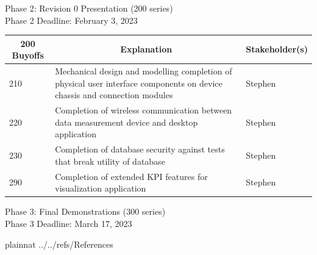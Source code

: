 \documentclass[12pt]{article}
\begin{document}
\newpage
\noindent
Phase 2: Revision 0 Presentation (200 series)\\
Phase 2 Deadline: February 3, 2023\\

\begin{table}[H]
  \centering
  \begin{tabular}{|p{2cm}|p{10cm}|p{2cm}|}
  \hline
  \multicolumn{1}{|c|}{\textbf{200 Buyoffs}} & \multicolumn{1}{c|}{\textbf{Explanation}} & \multicolumn{1}{|c|}{\textbf{Stakeholder(s)}}
  \\ \hline
  210
  & Mechanical design and modelling completion of physical user interface components on device chassis and connection modules
  & Stephen
  \newline                                
  \\ \hline

  220                              
  & Completion of wireless communication between data measurement device and desktop application 
  & Stephen
  \newline                                
  \\ \hline

  230                          
  & Completion of database security against tests that break utility of database
  & Stephen
  \newline                                
  \\ \hline

  290                                
  & Completion of extended KPI features for visualization application
  & Stephen 
  \newline                            
  \\ \hline

  \end{tabular}
\end{table}
\newpage

\noindent
Phase 3: Final Demonstrations (300 series)\\
Phase 3 Deadline: March 17, 2023\\






\newpage

 {plainnat}
 {../../refs/References}

\newpage

\noindent {}
\end{document}
